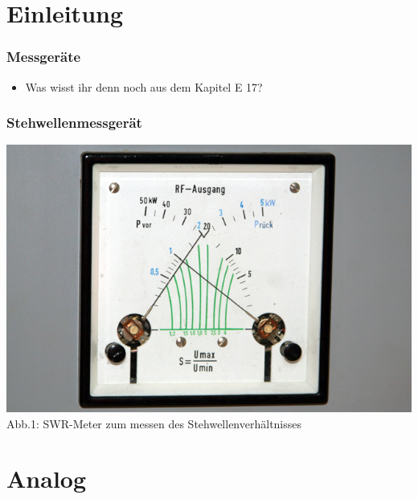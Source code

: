 


\subtitle{Technik A 16: \\
          Messtechnik \\[2em]}
\date{Stand \today}



\section*{Einleitung}

\begin{frame}
    \frametitle{Messgeräte}
    \begin{itemize}
		\item Was wisst ihr denn noch aus dem Kapitel E 17?
    \end{itemize}
\end{frame}

\begin{frame}
    \frametitle{Stehwellenmessgerät}
    \begin{center}
        \includegraphics[width=1\textwidth]{a16/RS_SWR.jpg}\\
        Abb.1: SWR-Meter zum messen des Stehwellenverhältnisses \cite{wmen}
	\end{center}
\end{frame}

\section*{Analog}

